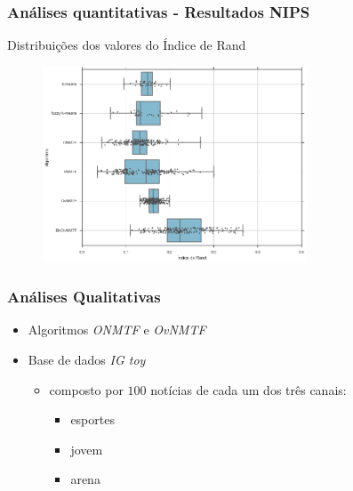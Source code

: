 \documentclass[10pt]{beamer}
\begin{document}
\begin{frame}
\frametitle{Análises quantitativas - Resultados NIPS}

Distribuições dos valores do Índice de Rand
\begin{figure}[H]
    \centering
    \includegraphics[width=0.7\textwidth]{img/boxplot-all-rand-nips.png}
\end{figure}


\end{frame}


\begin{frame}
\frametitle{Análises Qualitativas}

  \begin{itemize}
    \item Algoritmos \textit{ONMTF} e \textit{OvNMTF}
    \item Base de dados \textit{IG toy}
    \begin{itemize}
      \item composto por $100$ notícias de cada um dos três canais:
      \begin{itemize}
        \item esportes
        \item jovem
        \item arena
      \end{itemize}
    \end{itemize}
  \end{itemize}

\end{frame}
\end{document}
